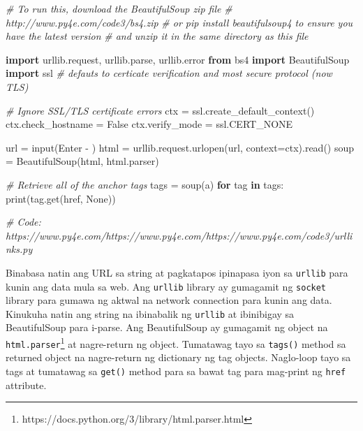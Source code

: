 \documentclass[10pt,]{book}
\newenvironment{Shaded}{}{}
\newcommand{\BuiltInTok}[1]{\textcolor[rgb]{0.00,0.50,0.00}{#1}}
\newcommand{\CommentTok}[1]{\textcolor[rgb]{0.38,0.63,0.69}{\textit{#1}}}
\newcommand{\ControlFlowTok}[1]{\textcolor[rgb]{0.00,0.44,0.13}{\textbf{#1}}}
\newcommand{\ImportTok}[1]{\textcolor[rgb]{0.00,0.50,0.00}{\textbf{#1}}}
\newcommand{\KeywordTok}[1]{\textcolor[rgb]{0.00,0.44,0.13}{\textbf{#1}}}
\newcommand{\NormalTok}[1]{#1}
\newcommand{\OperatorTok}[1]{\textcolor[rgb]{0.40,0.40,0.40}{#1}}
\newcommand{\StringTok}[1]{\textcolor[rgb]{0.25,0.44,0.63}{#1}}
\newcommand{\VariableTok}[1]{\textcolor[rgb]{0.10,0.09,0.49}{#1}}
\begin{document}
  

\begin{Shaded}
\begin{Highlighting}[]
\CommentTok{\# To run this, download the BeautifulSoup zip file}
\CommentTok{\# http://www.py4e.com/code3/bs4.zip}
\CommentTok{\# or pip install beautifulsoup4 to ensure you have the latest version}
\CommentTok{\# and unzip it in the same directory as this file}

\ImportTok{import}\NormalTok{ urllib.request, urllib.parse, urllib.error}
\ImportTok{from}\NormalTok{ bs4 }\ImportTok{import}\NormalTok{ BeautifulSoup}
\ImportTok{import}\NormalTok{ ssl }\CommentTok{\# defauts to certicate verification and most secure protocol (now TLS)}

\CommentTok{\# Ignore SSL/TLS certificate errors}
\NormalTok{ctx }\OperatorTok{=}\NormalTok{ ssl.create\_default\_context()}
\NormalTok{ctx.check\_hostname }\OperatorTok{=} \VariableTok{False}
\NormalTok{ctx.verify\_mode }\OperatorTok{=}\NormalTok{ ssl.CERT\_NONE}

\NormalTok{url }\OperatorTok{=} \BuiltInTok{input}\NormalTok{(}\StringTok{\textquotesingle{}Enter {-} \textquotesingle{}}\NormalTok{)}
\NormalTok{html }\OperatorTok{=}\NormalTok{ urllib.request.urlopen(url, context}\OperatorTok{=}\NormalTok{ctx).read()}
\NormalTok{soup }\OperatorTok{=}\NormalTok{ BeautifulSoup(html, }\StringTok{\textquotesingle{}html.parser\textquotesingle{}}\NormalTok{)}

\CommentTok{\# Retrieve all of the anchor tags}
\NormalTok{tags }\OperatorTok{=}\NormalTok{ soup(}\StringTok{\textquotesingle{}a\textquotesingle{}}\NormalTok{)}
\ControlFlowTok{for}\NormalTok{ tag }\KeywordTok{in}\NormalTok{ tags:}
    \BuiltInTok{print}\NormalTok{(tag.get(}\StringTok{\textquotesingle{}href\textquotesingle{}}\NormalTok{, }\VariableTok{None}\NormalTok{))}

\CommentTok{\# Code: https://www.py4e.com/https://www.py4e.com/https://www.py4e.com/code3/urllinks.py}
\end{Highlighting}
\end{Shaded}

Binabasa natin ang URL sa string at pagkatapos ipinapasa iyon sa
\texttt{urllib} para kunin ang data mula sa web. Ang \texttt{urllib}
library ay gumagamit ng \texttt{socket} library para gumawa ng aktwal na
network connection para kunin ang data. Kinukuha natin ang string na
ibinabalik ng \texttt{urllib} at ibinibigay sa BeautifulSoup para
i-parse. Ang BeautifulSoup ay gumagamit ng object na
\texttt{html.parser}\footnote{https://docs.python.org/3/library/html.parser.html}
at nagre-return ng object. Tumatawag tayo sa \texttt{tags()} method sa
returned object na nagre-return ng dictionary ng tag objects. Naglo-loop
tayo sa tags at tumatawag sa \texttt{get()} method para sa bawat tag
para mag-print ng \texttt{href} attribute.
\end{document}
